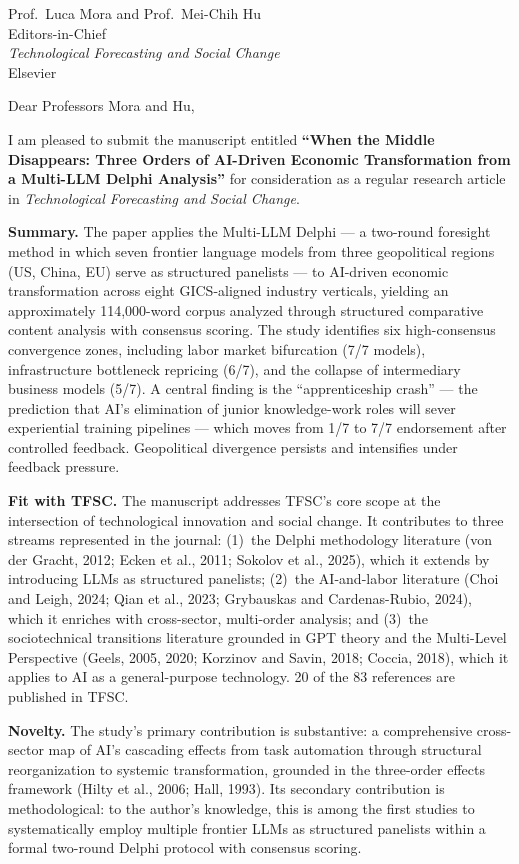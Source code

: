 \documentclass[11pt]{letter}
\date{\today}
\begin{document}
\begin{letter}{%
Prof.\ Luca Mora and Prof.\ Mei-Chih Hu\\
Editors-in-Chief\\
\textit{Technological Forecasting and Social Change}\\
Elsevier}

\opening{Dear Professors Mora and Hu,}

I am pleased to submit the manuscript entitled \textbf{``When the Middle Disappears: Three Orders of AI-Driven Economic Transformation from a Multi-LLM Delphi Analysis''} for consideration as a regular research article in \textit{Technological Forecasting and Social Change}.

\textbf{Summary.} The paper applies the Multi-LLM Delphi --- a two-round foresight method in which seven frontier language models from three geopolitical regions (US, China, EU) serve as structured panelists --- to AI-driven economic transformation across eight GICS-aligned industry verticals, yielding an approximately 114,000-word corpus analyzed through structured comparative content analysis with consensus scoring. The study identifies six high-consensus convergence zones, including labor market bifurcation (7/7 models), infrastructure bottleneck repricing (6/7), and the collapse of intermediary business models (5/7). A central finding is the ``apprenticeship crash'' --- the prediction that AI's elimination of junior knowledge-work roles will sever experiential training pipelines --- which moves from 1/7 to 7/7 endorsement after controlled feedback. Geopolitical divergence persists and intensifies under feedback pressure.

\textbf{Fit with TFSC.} The manuscript addresses TFSC's core scope at the intersection of technological innovation and social change. It contributes to three streams represented in the journal: (1)~the Delphi methodology literature (von der Gracht, 2012; Ecken et al., 2011; Sokolov et al., 2025), which it extends by introducing LLMs as structured panelists; (2)~the AI-and-labor literature (Choi and Leigh, 2024; Qian et al., 2023; Grybauskas and Cardenas-Rubio, 2024), which it enriches with cross-sector, multi-order analysis; and (3)~the sociotechnical transitions literature grounded in GPT theory and the Multi-Level Perspective (Geels, 2005, 2020; Korzinov and Savin, 2018; Coccia, 2018), which it applies to AI as a general-purpose technology. 20 of the 83 references are published in TFSC.

\textbf{Novelty.} The study's primary contribution is substantive: a comprehensive cross-sector map of AI's cascading effects from task automation through structural reorganization to systemic transformation, grounded in the three-order effects framework (Hilty et al., 2006; Hall, 1993). Its secondary contribution is methodological: to the author's knowledge, this is among the first studies to systematically employ multiple frontier LLMs as structured panelists within a formal two-round Delphi protocol with consensus scoring.


\end{letter}
\end{document}
